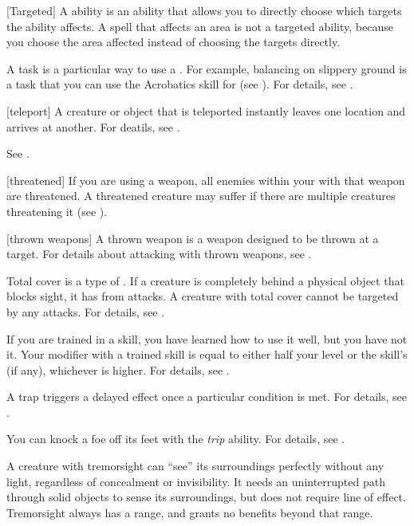 [Targeted] A  ability is an ability that allows you to directly choose which targets the ability affects.
A spell that affects an area is not a targeted ability, because you choose the area affected instead of choosing the targets directly.

 A task is a particular way to use a .
For example, balancing on slippery ground is a task that you can use the Acrobatics skill for (see ).
For details, see .

[teleport] A creature or object that is teleported instantly leaves one location and arrives at another.
For deatils, see .

 See .

[threatened] If you are using a  weapon, all enemies within your  with that weapon are threatened.
A threatened creature may suffer  if there are multiple creatures threatening it (see ).

[thrown weapons] A thrown weapon is a weapon designed to be thrown at a target.
For details about attacking with thrown weapons, see .

 Total cover is a type of .
If a creature is completely behind a physical object that blocks sight, it has  from attacks.
A creature with total cover cannot be targeted by any attacks.
For details, see .

 If you are trained in a skill, you have learned how to use it well, but you have not  it.
Your modifier with a trained skill is equal to either half your level  or the skill's  (if any), whichever is higher.
For details, see .

 A trap triggers a delayed effect once a particular condition is met.
For details, see .

 You can knock a foe off its feet with the \textit{trip} ability.
For details, see .

 A creature with tremorsight can ``see'' its surroundings perfectly without any light, regardless of concealment or invisibility.
It needs an uninterrupted path through solid objects to sense its surroundings, but does not require line of effect.
Tremorsight always has a range, and grants no benefits beyond that range.

